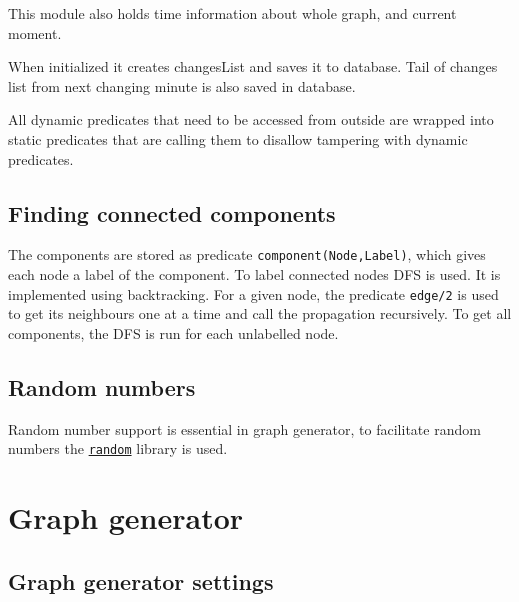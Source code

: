 \documentclass[11pt, a4paper]{article}
\newcommand{\pl}[1]{\texttt{#1}} %
\theoremstyle{plain}
\theoremstyle{definition}
\theoremstyle{remark}
\begin{document}
This module also holds time information about whole graph, and current moment.

When initialized it creates changesList and saves it to database. Tail of
changes list from next changing minute is also saved in database.

All dynamic predicates that need to be accessed from outside are wrapped
into static predicates that are calling them to disallow tampering with
dynamic predicates.
 
\subsection{Finding connected components}
\label{sec:computing-components}

The components are stored as predicate \pl{component(Node,Label)},
which gives each node a label of the component. 
To label connected nodes DFS is used. 
It is implemented using backtracking. 
For a given node, the predicate \pl{edge/2} is used 
to get its neighbours one at a time and call the propagation 
recursively.
To get all components, the DFS is run for each unlabelled node. 
 
\subsection{Random numbers}
\label{sec:computing-random}

Random number support is essential in graph generator, to facilitate random
numbers the \href{https://www.fi.muni.cz/~hanka/sicstus/doc/html/sicstus/lib_002drandom.html#lib_002drandom}{\pl{random}}
library is used.

\iffalse
\begin{itemize}
    \item \pl{random} library
    \item \pl{use\_module( library( random ) ).}
    \item \href{https://www.fi.muni.cz/~hanka/sicstus/doc/html/sicstus/lib_002drandom.html#lib_002drandom}{\texttt{https://www.fi.muni.cz/$\sim$hanka/sicstus/doc/html/sicstus/\\lib\_002drandom.html\#lib\_002drandom}}
\end{itemize}
\fi

\section{Graph generator}
\label{sec:generator}

\subsection{Graph generator settings}
\label{sec:generator-settings}
\end{document}
